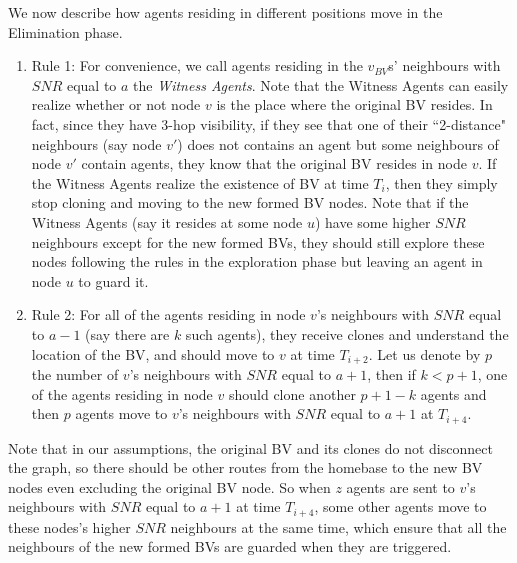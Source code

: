 We now  describe how agents residing in different positions move in the Elimination phase.
\begin{enumerate}

\item Rule 1: For convenience, we call agents residing in the   $v_{BV}$s' neighbours with $SNR$ equal to $a$ the {\em Witness Agents}. Note that the  Witness Agents can easily realize whether or not node $v$ is the place where the original BV resides. In fact, since they have 3-hop visibility, if they see that one of their ``2-distance" neighbours (say node $v'$) does not contains an agent but some neighbours of node $v'$ contain agents, they   know that the original BV resides in node $v$. If the Witness Agents realize the existence of BV at time  $T_i$, then they simply stop cloning and moving to the new formed BV nodes. Note that if the Witness Agents (say it resides at some node $u$) have some higher $SNR$ neighbours except for the new formed BVs, they should still explore these nodes following the rules in the exploration phase but leaving an agent in node $u$ to guard it.  

\item Rule 2: For all of the agents residing in node $v$'s neighbours with $SNR$ equal to $a-1$ (say  there are $k$ such agents), they receive clones and understand the location of the BV,  and should move to $v$ at  time $T_{i+2}$. Let us denote by $p$ the number of $v$'s neighbours with $SNR$ equal to $a+1$, then if $k< p+1$, one of the agents residing in node $v$ should clone another $p+1-k$ agents and then $p$ agents move to $v$'s neighbours with $SNR$ equal to $a+1$ at $T_{i+4}$.
\end{enumerate}

\color{blue} Note that in our assumptions, the original BV and its clones do not disconnect the graph,  so there should be other routes from the homebase to the new BV nodes even excluding   the original BV node. \color{black} So when $z$ agents are sent to $v$'s neighbours with $SNR$ equal to $a+1$ at time $T_{i+4}$, some other agents move to these nodes's higher $SNR$ neighbours at the same time, which ensure that all the neighbours of the new formed BVs are guarded when they are triggered. 

